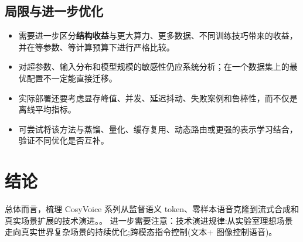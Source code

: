 \documentclass[UTF8,11pt,a4paper]{ctexart}
\newcommand{\term}[1]{\textbf{\textcolor{mainblue}{#1}}}
\begin{document}
\subsection{局限与进一步优化}
\begin{itemize}
\item 需要进一步区分\term{结构收益}与更大算力、更多数据、不同训练技巧带来的收益，并在等参数、等计算预算下进行严格比较。
\item 对超参数、输入分布和模型规模的敏感性仍应系统分析；在一个数据集上的最优配置不一定能直接迁移。
\item 实际部署还要考虑显存峰值、并发、延迟抖动、失败案例和鲁棒性，而不仅是离线平均指标。
\item 可尝试将该方法与蒸馏、量化、缓存复用、动态路由或更强的表示学习结合，验证不同优化是否互补。
\end{itemize}

\section{结论}
总体而言，梳理 CosyVoice 系列从监督语义 token、零样本语音克隆到流式合成和真实场景扩展的技术演进。。 进一步需要注意：技术演进规律:从实验室理想场景走向真实世界复杂场景的持续优化;跨模态指令控制(文本+ 图像控制语音)。
\end{document}
